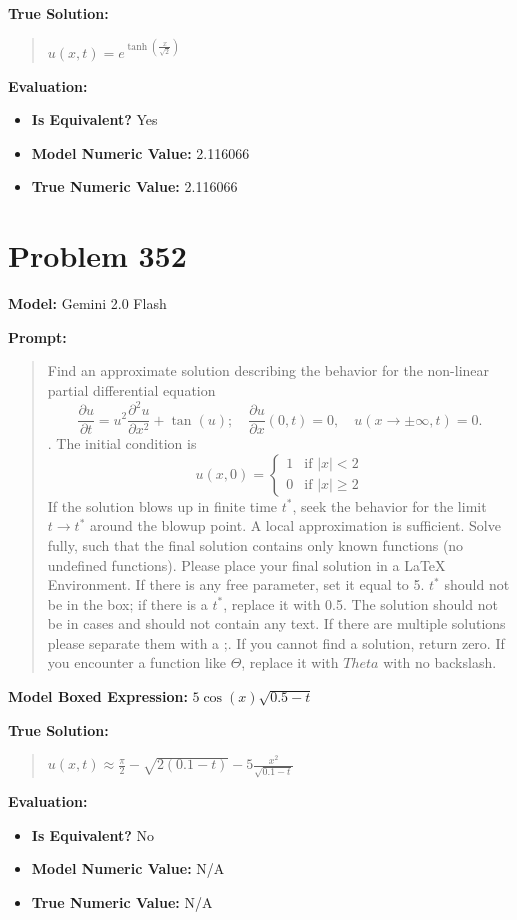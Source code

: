 \documentclass{article}
\begin{document}
{\textbf{True Solution:}
\begin{quote}
$u(x,t) = e^{\tanh\left(\frac{x}{\sqrt{2}}\right)}$
\end{quote}

\textbf{Evaluation:}
\begin{itemize}
\item \textbf{Is Equivalent?} Yes
\item \textbf{Model Numeric Value:} 2.116066
\item \textbf{True Numeric Value:} 2.116066
\end{itemize}
\vspace{1cm}
\section*{Problem 352}
\textbf{Model:} Gemini 2.0 Flash

\textbf{Prompt:}
\begin{quote}
Find an approximate solution describing the behavior for the non-linear partial differential equation $$ \frac{\partial u}{\partial t} = u^2 \frac{\partial^2 u}{\partial x^2} + \tan(u);\quad \frac{\partial u}{\partial x}(0, t) = 0,\quad u(x\to\pm\infty, t) = 0.$$. The initial condition is $$ u(x, 0) = \begin{cases} 1 & \text{if } |x| < 2 \\ 0 & \text{if } |x| \ge 2 \end{cases} $$ If the solution blows up in finite time $t^*$, seek the behavior for the limit $t \rightarrow t^*$ around the blowup point. A local approximation is sufficient. Solve fully, such that the final solution contains only known functions (no undefined functions). Please place your final solution in a \boxed{} LaTeX Environment. If there is any free parameter, set it equal to 5. $t^*$ should not be in the box; if there is a $t^*$, replace it with 0.5. The solution should not be in cases and should not contain any text. If there are multiple solutions please separate them with a ;. If you cannot find a solution, return zero. If you encounter a function like $\Theta$, replace it with $Theta$ with no backslash.
\end{quote}
\textbf{Model Boxed Expression:} $5 \cos(x) \sqrt{0.5 - t}$

\textbf{True Solution:}
\begin{quote}
$u(x,t) \approx \frac{\pi}{2} - \sqrt{2(0.1-t)} - 5 \frac{x^2}{\sqrt{0.1-t}}$
\end{quote}

\textbf{Evaluation:}
\begin{itemize}
\item \textbf{Is Equivalent?} No
\item \textbf{Model Numeric Value:} N/A
\item \textbf{True Numeric Value:} N/A
\end{itemize}
\vspace{1cm}
}
\end{document}
